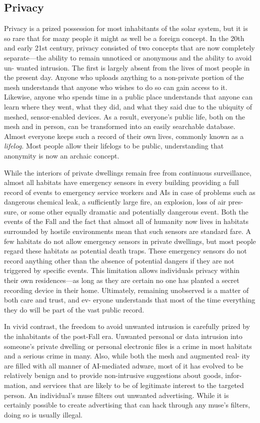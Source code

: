 \subsection{Privacy}

Privacy is a prized possession for most inhabitants of 
the solar system, but it is so rare that for many people 
it might as well be a foreign concept. In the 20th and 
early 21st century, privacy consisted of two concepts 
that are now completely separate—the ability to remain 
unnoticed or anonymous and the ability to avoid un-
wanted intrusion. The first is largely absent from the 
lives of most people in the present day. Anyone who 
uploads anything to a non-private portion of the mesh 
understands that anyone who wishes to do so can gain 
access to it. Likewise, anyone who spends time in a 
public place understands that anyone can learn where 
they went, what they did, and what they said due to the 
ubiquity of meshed, sensor-enabled devices. As a result, 
everyone's public life, both on the mesh and in person, 
can be transformed into an easily searchable database. 
Almost everyone keeps such a record of their own lives, 
commonly known as a \textit{lifelog.} Most people allow their 
lifelogs to be public, understanding that anonymity is 
now an archaic concept.

While the interiors of private dwellings remain free 
from continuous surveillance, almost all habitats have 
emergency sensors in every building providing a full 
record of events to emergency service workers and AIs 
in case of problems such as dangerous chemical leak, 
a sufficiently large fire, an explosion, loss of air pres-
sure, or some other equally dramatic and potentially 
dangerous event. Both the events of the Fall and the 
fact that almost all of humanity now lives in habitats 
surrounded by hostile environments mean that such 
sensors are standard fare. A few habitats do not allow 
emergency sensors in private dwellings, but most 
people regard these habitats as potential death traps. 
These emergency sensors do not record anything other 
than the absence of potential dangers if they are not 
triggered by specific events. This limitation allows 
individuals privacy within their own residences—as 
long as they are certain no one has planted a secret 
recording device in their home. Ultimately, remaining 
unobserved is a matter of both care and trust, and ev-
eryone understands that most of the time everything 
they do will be part of the vast public record.

In vivid contrast, the freedom to avoid unwanted 
intrusion is carefully prized by the inhabitants of the 
post-Fall era. Unwanted personal or data intrusion 
into someone's private dwelling or personal electronic 
files is a crime in most habitats and a serious crime in 
many. Also, while both the mesh and augmented real-
ity are filled with all manner of AI-mediated adware, 
most of it has evolved to be relatively benign and to 
provide non-intrusive suggestions about goods, infor-
mation, and services that are likely to be of legitimate 
interest to the targeted person. An individual's muse 
filters out unwanted advertising. While it is certainly 
possible to create advertising that can hack through 
any muse's filters, doing so is usually illegal.

